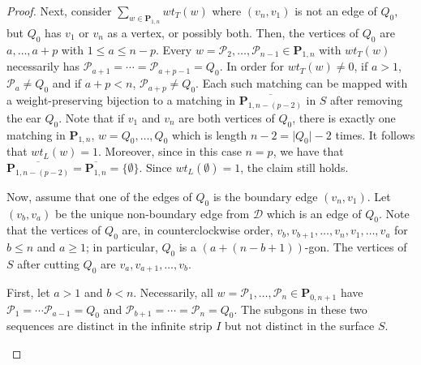 \documentclass[12pt]{article}
\theoremstyle{remark}
\newcommand*{\pathset}[2]{\mathbf{P}_{#1,#2}}
\newcommand*{\poly}[1]{\mathcal{P}_{#1}}
\newcommand*{\D}{\mathcal{D}}
\begin{document}
\begin{proof}
Next, consider $\sum_{w \in \pathset{1}{n}} wt_T(w)$ where $(v_n,v_1)$ is not an edge of $Q_0$, but $Q_0$ has $v_1$ or $v_n$ as a vertex, or possibly both. Then, the vertices of $Q_0$ are $a,\ldots,a+p$ with $1 \leq a \leq n-p$. Every $w = \poly{2},\ldots,\poly{n-1} \in \pathset{1}{n}$ with $wt_T(w)$ necessarily has $\poly{a+1} = \cdots = \poly{a+p-1} = Q_0$. In order for $wt_T(w) \neq 0$, if $a > 1$, $\poly{a} \neq Q_0$ and if $a+p < n$, $\poly{a+p} \neq Q_0$. Each such matching can be mapped with a weight-preserving bijection to a matching in $\overline{\pathset{1}{n - (p-2)}}$ in $S$ after removing the ear $Q_0$. Note that if $v_1$ and $v_n$ are both vertices of $Q_0$, there is exactly one matching in $\pathset{1}{n}$, $w = Q_0,\ldots,Q_0$ which is length  $n-2 = \vert Q_0  \vert - 2$ times. It follows that $wt_L(w) = 1$. Moreover, since in this case $n = p$, we have that $\overline{\pathset{1}{n-(p-2)}} = \overline{\pathset{1}{n}} = \{\emptyset\} $. Since $wt_L(\emptyset) = 1$, the claim still holds. 

Now, assume that one of the edges of $Q_0$ is the boundary edge $(v_n,v_1)$. Let $(v_b,v_a)$ be the unique non-boundary edge from $\D$ which is an edge of $Q_0$.  Note that the vertices of $Q_0$ are, in counterclockwise order, $v_b,v_{b+1},\ldots,v_n,v_1,\ldots,v_a$ for $b \leq n$ and $a \geq 1$; in particular, $Q_0$ is a $(a + (n-b+1))$-gon. The vertices of $S$ after cutting $Q_0$ are $v_a,v_{a+1},\ldots,v_b$. 

First, let $a > 1$ and $b < n$. Necessarily, all $w = \poly{1},\ldots,\poly{n} \in \pathset{0}{n+1}$ have $\poly{1} = \cdots \poly{a-1} = Q_0$ and $\poly{b+1} = \cdots = \poly{n} = Q_0$. The subgons in these two sequences are distinct in the infinite strip $I$ but not distinct in the surface $S$.

\begin{center}
\end{center}


\end{proof}
\end{document}
